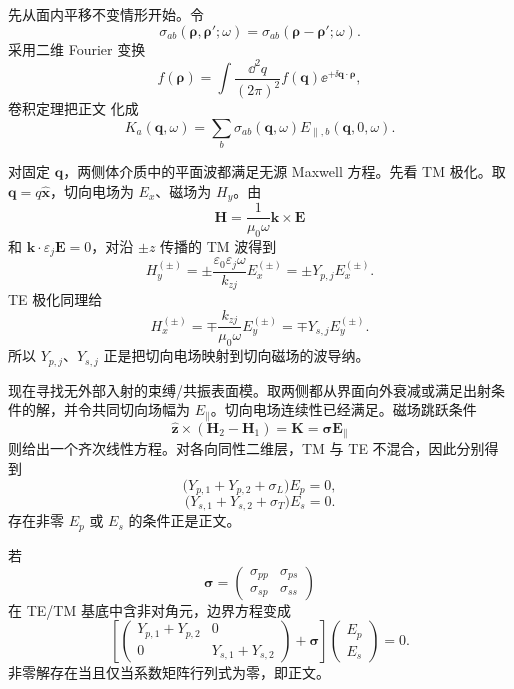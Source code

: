 

\begin{derivation}[各向异性导电薄层的模式极点]
先从面内平移不变情形开始。令
\[
\sigma_{ab}(\boldsymbol\rho,\boldsymbol\rho';\omega)
=
\sigma_{ab}(\boldsymbol\rho-\boldsymbol\rho';\omega).
\]
采用二维 Fourier 变换
\[
f(\boldsymbol\rho)
=
\int\frac{\dd^2q}{(2\pi)^2}
f(\mathbf q)\ee^{+\ii\mathbf q\cdot\boldsymbol\rho},
\]
卷积定理把正文 化成
\[
K_a(\mathbf q,\omega)
=
\sum_b
\sigma_{ab}(\mathbf q,\omega)
E_{\parallel,b}(\mathbf q,0,\omega).
\]

对固定 $\mathbf q$，两侧体介质中的平面波都满足无源 Maxwell 方程。先看 TM 极化。取 $\mathbf q=q\hat{\mathbf x}$，切向电场为 $E_x$、磁场为 $H_y$。由
\[
\mathbf H
=
\frac1{\mu_0\omega}\mathbf k\times\mathbf E
\]
和
$\mathbf k\cdot\varepsilon_j\mathbf E=0$，对沿 $\pm z$ 传播的 TM 波得到
\[
H_y^{(\pm)}
=
\pm
\frac{\varepsilon_0\varepsilon_j\omega}{k_{zj}}
E_x^{(\pm)}
=
\pm Y_{p,j}E_x^{(\pm)}.
\]
TE 极化同理给
\[
H_x^{(\pm)}
=
\mp
\frac{k_{zj}}{\mu_0\omega}
E_y^{(\pm)}
=
\mp Y_{s,j}E_y^{(\pm)}.
\]
所以 $Y_{p,j}$、$Y_{s,j}$ 正是把切向电场映射到切向磁场的波导纳。

现在寻找无外部入射的束缚/共振表面模。取两侧都从界面向外衰减或满足出射条件的解，并令共同切向场幅为 $E_\parallel$。切向电场连续性已经满足。磁场跳跃条件
\[
\hat{\mathbf z}\times(\mathbf H_2-\mathbf H_1)
=
\mathbf K
=
\boldsymbol\sigma\mathbf E_\parallel
\]
则给出一个齐次线性方程。对各向同性二维层，TM 与 TE 不混合，因此分别得到
\[
\bigl(Y_{p,1}+Y_{p,2}+\sigma_L\bigr)E_p=0,
\]
\[
\bigl(Y_{s,1}+Y_{s,2}+\sigma_T\bigr)E_s=0.
\]
存在非零 $E_p$ 或 $E_s$ 的条件正是正文。

若
\[
\boldsymbol\sigma
=
\begin{pmatrix}
\sigma_{pp}&\sigma_{ps}\\
\sigma_{sp}&\sigma_{ss}
\end{pmatrix}
\]
在 TE/TM 基底中含非对角元，边界方程变成
\[
\left[
\begin{pmatrix}
Y_{p,1}+Y_{p,2}&0\\
0&Y_{s,1}+Y_{s,2}
\end{pmatrix}
+
\boldsymbol\sigma
\right]
\begin{pmatrix}E_p\\E_s\end{pmatrix}
=0.
\]
非零解存在当且仅当系数矩阵行列式为零，即正文。


\end{derivation}
